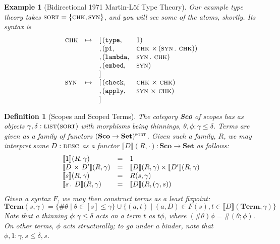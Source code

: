 \documentclass[format=acmsmall, screen, review, anonymous, timestamp]{acmart}
\newtheorem{defn}[thm]{Definition}
\newtheorem{eg}[thm]{Example}
\begin{document}
\begin{eg}[Bidirectional 1971 Martin-L\"of Type Theory]
  Our example type theory takes $\textsc{sort} = \{\textsc{chk},\textsc{syn}\}$, and you will see some of the atoms, shortly. Its syntax is
  \[\begin{array}{lcr@{\,}ll}
      \syso{chk} & \mapsto & [ & (\mathtt{type},     & \red{1}) \\
                 &         & , & (\mathtt{pi},       & \syso{chk} \dx (\syso{syn}\mathop{\red{.}\:}\syso{chk})) \\
                 &         & , & (\mathtt{lambda},   & \syso{syn}\db\syso{chk}) \\
                 &         & , & (\mathtt{embed},    & \syso{syn}) \\
                 &         & ] \\
      \syso{syn} & \mapsto & [ & (\mathtt{check},    & \syso{chk} \dx \syso{chk}) \\
                 &         & , & (\mathtt{apply},    & \syso{syn} \dx \syso{chk}) \\
                 &         & ]
  \end{array}\]
\end{eg}

\newcommand{\sem}[1]{\llbracket #1 \rrbracket}
\newcommand{\st}{\mathrel{\mid}}
\begin{defn}[Scopes and Scoped Terms]
  The category \textbf{Sco} of scopes has as objects $\gamma,\delta : \textsc{list}(\textsc{sort})$ with
  morphisms being thinnings, $\theta,\phi : \gamma \le \delta$. Terms are given as a
  family of functors $(\textbf{Sco}\to\textbf{Set})^{\textsc{sort}}$. Given such a family, $R$, we may interpret
  some $D:\textsc{desc}$ as a functor $\llbracket D \rrbracket(R,\cdot) : \textbf{Sco}\to\textbf{Set}$ as follows:
  \[\begin{array}{lcl}
      \sem{\red{1}}(R,\gamma) & = & 1 \\
      \sem{D\dx D'}(R,\gamma) & = & \sem{D}(R,\gamma) \times \sem{D'}(R,\gamma) \\
      \sem{s}(R,\gamma) & = & R(s,\gamma) \\
      \sem{s\db D}(R,\gamma) & = & \sem{D}(R, (\gamma, s))
    \end{array}\]
  Given a syntax $F$, we may then construct terms as a least fixpoint:
  \[
    \textbf{Term}(s, \gamma) = \{\#\theta\st\theta\in[s]\le \gamma\} \cup \{(a,t) \st (a,D)\in F(s), t\in\sem{D}(\textbf{Term},\gamma)\}
  \]
  Note that a thinning $\phi:\gamma\le\delta$ acts on a term $t$ as $t\phi$, where $(\#\theta)\phi = \#(\theta;\phi)$. On other terms,
  $\phi$ acts structurally; to go under a binder, note that $\phi,1:\gamma,s\le\delta,s$.
\end{defn}
\end{document}
